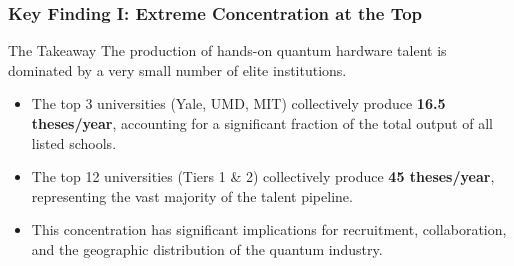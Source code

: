 \documentclass[aspectratio=169]{beamer}
\begin{document}
\begin{frame}
    \frametitle{Key Finding I: Extreme Concentration at the Top}
    
    \begin{alertblock}{The Takeaway}
        The production of hands-on quantum hardware talent is dominated by a very small number of elite institutions.
    \end{alertblock}
    
    \begin{itemize}
        \item The top 3 universities (Yale, UMD, MIT) collectively produce \textbf{16.5 theses/year}, accounting for a significant fraction of the total output of all listed schools.
        \item The top 12 universities (Tiers 1 \& 2) collectively produce \textbf{45 theses/year}, representing the vast majority of the talent pipeline.
        \item This concentration has significant implications for recruitment, collaboration, and the geographic distribution of the quantum industry.
    \end{itemize}
\end{frame}
\end{document}
